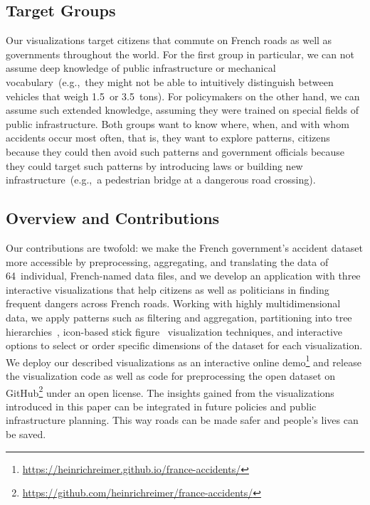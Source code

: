 \subsection{Target Groups}
Our visualizations target citizens that commute on French roads as well as governments throughout the world. For the first group in particular, we can not assume deep knowledge of public infrastructure or mechanical vocabulary~(e.g.,~they might not be able to intuitively distinguish between vehicles that weigh 1.5~or 3.5~tons). For policymakers on the other hand, we can assume such extended knowledge, assuming they were trained on special fields of public infrastructure. Both groups want to know where, when, and with whom accidents occur most often, that is, they want to explore patterns, citizens because they could then avoid such patterns and government officials because they could target such patterns by introducing laws or building new infrastructure~(e.g.,~a pedestrian bridge at a dangerous road crossing).

\subsection{Overview and Contributions}
Our contributions are twofold: \Ni we make the French government's accident dataset more accessible by preprocessing, aggregating, and translating the data of 64~individual, French-named data files, and \Nii we develop an application with three interactive visualizations that help citizens as well as politicians in finding frequent dangers across French roads.
Working with highly multidimensional data, we apply patterns such as filtering and aggregation, partitioning into tree hierarchies~\cite{Shneiderman1992}, icon-based stick figure~\cite{PickettG1988} visualization techniques, and interactive options to select or order specific dimensions of the dataset for each visualization.
We deploy our described visualizations as an interactive online demo\footnote{\url{https://heinrichreimer.github.io/france-accidents/}} and release the visualization code as well as code for preprocessing the open dataset on GitHub\footnote{\url{https://github.com/heinrichreimer/france-accidents/}} under an open license.
The insights gained from the visualizations introduced in this paper can be integrated in future policies and public infrastructure planning. This way roads can be made safer and people's lives can be saved.
